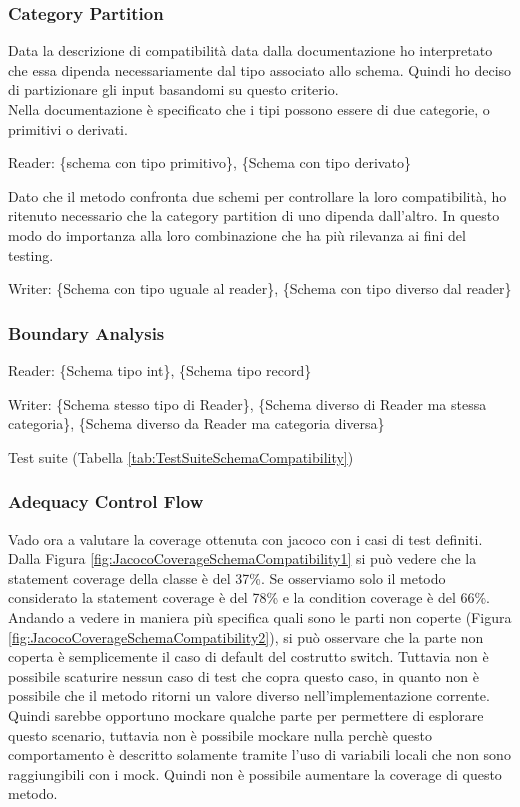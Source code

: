 \documentclass[12pt, a4paper]{article}
\begin{document}
\subsubsection{Category Partition}


Data la descrizione di compatibilità data dalla documentazione ho interpretato che essa dipenda necessariamente dal tipo 
associato allo schema. Quindi ho deciso di partizionare gli input basandomi su questo criterio. \\

Nella documentazione è specificato che i tipi possono essere di due categorie, o primitivi o derivati.

Reader: \{schema con tipo primitivo\}, \{Schema con tipo derivato\}

Dato che il metodo confronta due schemi per controllare la loro compatibilità, ho ritenuto necessario che la category partition
di uno dipenda dall'altro. In questo modo do importanza alla loro combinazione che ha più rilevanza ai fini del testing.

Writer: \{Schema con tipo uguale al reader\}, \{Schema con tipo diverso dal reader\}


\subsubsection{Boundary Analysis}

Reader: \{Schema tipo int\}, \{Schema tipo record\}

Writer: \{Schema stesso tipo di Reader\}, \{Schema diverso di Reader ma stessa categoria\}, \{Schema diverso da Reader ma categoria diversa\}
  
Test suite (Tabella \ref{tab:TestSuiteSchemaCompatibility})

\subsubsection{Adequacy Control Flow}
Vado ora a valutare la coverage ottenuta con jacoco con i casi di test definiti.
Dalla Figura \ref{fig:JacocoCoverageSchemaCompatibility1} si può vedere che la statement coverage della classe è del 37\%.
Se osserviamo solo il metodo considerato la statement coverage è del 78\% e la condition coverage è del 66\%.
Andando a vedere in maniera più specifica quali sono le parti non coperte (Figura \ref{fig:JacocoCoverageSchemaCompatibility2}),
si può osservare che la parte non coperta è semplicemente il caso di default del costrutto switch.
Tuttavia non è possibile scaturire nessun caso di test che copra questo caso, in quanto non è possibile che il metodo
ritorni un valore diverso nell'implementazione corrente. Quindi sarebbe opportuno mockare qualche parte per permettere
di esplorare questo scenario, tuttavia non è possibile mockare nulla perchè questo comportamento è descritto solamente
tramite l'uso di variabili locali che non sono raggiungibili con i mock. Quindi non è possibile aumentare la coverage
di questo metodo. \\
\end{document}
